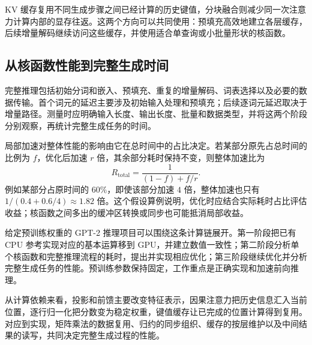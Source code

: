KV 缓存复用不同生成步骤之间已经计算的历史键值，分块融合则减少同一次注意力计算内部的显存往返。这两个方向可以共同使用：预填充高效地建立各层缓存，后续增量解码继续访问这些缓存，并使用适合单查询或小批量形状的核函数。

\subsection{从核函数性能到完整生成时间}

完整推理包括初始分词和嵌入、预填充、重复的增量解码、词表选择以及必要的数据传输。首个词元的延迟主要涉及初始输入处理和预填充；后续逐词元延迟取决于增量路径。测量时应明确输入长度、输出长度、批量和数据类型，并将这两个阶段分别观察，再统计完整生成任务的时间。

局部加速对整体性能的影响由它在总时间中的占比决定。若某部分原先占总时间的比例为 $f$，优化后加速 $r$ 倍，其余部分耗时保持不变，则整体加速比为
\begin{equation}
  R_{\mathrm{total}}=\frac{1}{(1-f)+f/r}.
  \label{l12:eq:amdahl}
\end{equation}
例如某部分占原时间的 $60\%$，即使该部分加速 $4$ 倍，整体加速也只有 $1/(0.4+0.6/4)\approx1.82$ 倍。这个假设算例说明，优化时应结合实际耗时占比评估收益；核函数之间多出的缓冲区转换或同步也可能抵消局部收益。

给定预训练权重的 GPT-2 推理项目可以围绕这条计算链展开。第一阶段把已有 CPU 参考实现对应的基本运算移到 GPU，并建立数值一致性；第二阶段分析单个核函数和完整推理流程的耗时，提出并实现相应优化；第三阶段继续优化并分析完整生成任务的性能。预训练参数保持固定，工作重点是正确实现和加速前向推理。

从计算依赖来看，投影和前馈主要改变特征表示，因果注意力把历史信息汇入当前位置，逐行归一化把分数变为稳定权重，键值缓存让已完成的位置计算得到复用。对应到实现，矩阵乘法的数据复用、归约的同步组织、缓存的按层维护以及中间结果的读写，共同决定完整生成过程的性能。
